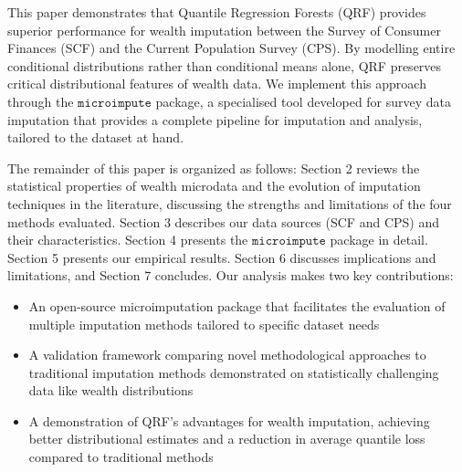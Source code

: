 This paper demonstrates that Quantile Regression Forests (QRF) provides superior performance for wealth imputation between the Survey of Consumer Finances (SCF) and the Current Population Survey (CPS). By modelling entire conditional distributions rather than conditional means alone, QRF preserves critical distributional features of wealth data. We implement this approach through the $\texttt{microimpute}$ package, a specialised tool developed for survey data imputation that provides a complete pipeline for imputation and analysis, tailored to the dataset at hand.

The remainder of this paper is organized as follows: Section 2 reviews the statistical properties of wealth microdata and the evolution of imputation techniques in the literature, discussing the strengths and limitations of the four methods evaluated. Section 3 describes our data sources (SCF and CPS) and their characteristics. Section 4 presents the $\texttt{microimpute}$ package in detail. Section 5 presents our empirical results. Section 6 discusses implications and limitations, and Section 7 concludes.
Our analysis makes two key contributions:
\begin{itemize}
    \item An open-source microimputation package that facilitates the evaluation of multiple imputation methods tailored to specific dataset needs
    \item A validation framework comparing novel methodological approaches to traditional imputation methods demonstrated on statistically challenging data like wealth distributions
    \item A demonstration of QRF's advantages for wealth imputation, achieving better distributional estimates and a reduction in average quantile loss compared to traditional methods 
\end{itemize}